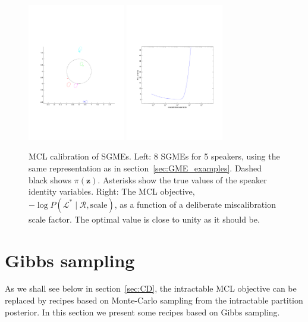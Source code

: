 \documentclass[a4paper,oneside,12pt,english]{report}
\def\zvec{\mathbf{z}}
\def\Lset{\mathcal{L}}
\def\Rset{\mathcal{R}}
\begin{document}
\begin{figure}[htb!]
\centering
\includegraphics[height=6cm,trim={3cm 7cm 4cm 8cm},clip]{Some_SGMEs.pdf}        %
\includegraphics[height=6cm,trim={0 7cm 6cm 8cm},clip]{SGME_calibration.pdf}
\caption[MCL calibration of SGMEs]{MCL calibration of SGMEs. Left: 8 SGMEs for 5 speakers, using the same representation as in section~\ref{sec:GME_examples}. Dashed black shows $\pi(\zvec)$. Asterisks show the true values of the speaker identity variables. Right: The MCL objective, $-\log P(\Lset^*\mid\Rset,\text{scale})$, as a function of a deliberate miscalibration scale factor. The optimal value is close to unity as it should be.}
\label{fig:SGME_MCL_CAL}
\end{figure}

\FloatBarrier
\section{Gibbs sampling}
As we shall see below in section~\ref{sec:CD}, the intractable MCL objective can be replaced by recipes based on Monte-Carlo sampling from the intractable partition posterior. In this section we present some recipes based on Gibbs sampling. 
\end{document}
